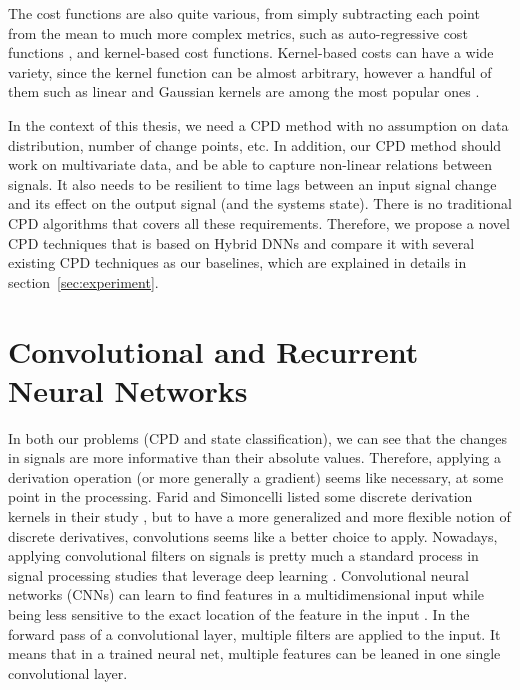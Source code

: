 The cost functions are also quite various, from simply subtracting each point from the mean to much more complex metrics, such as auto-regressive cost functions \cite{angelosante2012group}, and kernel-based cost functions. Kernel-based costs can have a wide variety, since the kernel function can be almost arbitrary, however a handful of them such as linear and Gaussian kernels are among the most popular ones \cite{Truong2018ChangePointSurvey}.

In the context of this thesis, we need a CPD method with no assumption on data distribution, number of change points, etc. In addition, our CPD method should work on multivariate data, and be able to capture non-linear relations between signals. It also needs to be resilient to time lags between an input signal change and its effect on the output signal (and the systems state). There is no traditional CPD algorithms that covers all these requirements.
Therefore, we propose a novel CPD techniques that is based on Hybrid DNNs and compare it with several existing CPD techniques as our baselines, which are explained in details in section~\ref{sec:experiment}.   


\section{Convolutional and Recurrent Neural Networks}
In both our problems (CPD and state classification), we can see that the changes in signals are more informative than their absolute values. Therefore, applying a derivation operation (or more generally a gradient) seems like necessary, at some point in the processing. Farid and Simoncelli listed some discrete derivation kernels in their study \cite{Farid2004}, but to have a more generalized and more flexible notion of discrete derivatives, convolutions seems like a better choice to apply. 
Nowadays, applying convolutional filters on signals is pretty much a standard process in signal processing studies that leverage deep learning \cite{morales2016deep, zeng2014convolutional, yang2015deep}. Convolutional neural networks (CNNs) can learn to find features in a multidimensional input while being less sensitive to the exact location of the feature in the input \cite{lecun2015deep}. In the forward pass of a convolutional layer, multiple filters are applied to the input. %
It means that in a trained neural net, multiple features can be leaned in one single convolutional layer.

